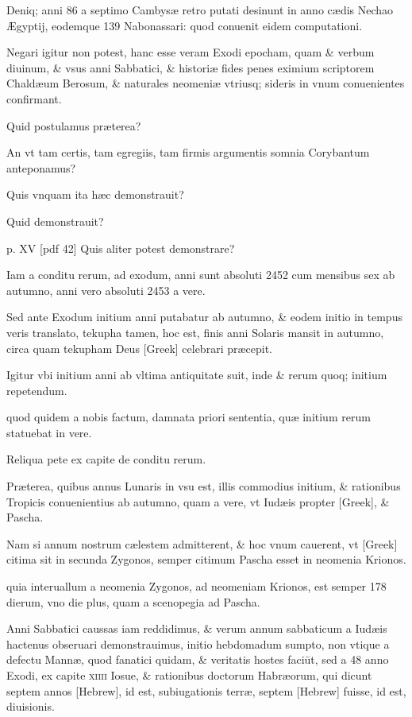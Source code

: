 \begin{parnumbers}
Deniq; anni 86 a septimo Cambysæ retro putati desinunt in anno
cædis Nechao Ægyptij, eodemque 139 Nabonassari: quod conuenit
eidem computationi.

Negari igitur non potest, hanc esse veram
Exodi epocham, quam \& verbum diuinum, \& vsus anni Sabbatici,
\& historiæ fides penes eximium scriptorem Chaldæum
Berosum, \& naturales neomeniæ vtriusq; sideris in vnum conuenientes
confirmant.

Quid postulamus præterea?

An vt tam certis,
tam egregiis, tam firmis argumentis somnia Corybantum anteponamus?

Quis vnquam ita hæc demonstrauit?

Quid demonstrauit?

\clearpage
p. XV [pdf 42]
Quis aliter potest demonstrare?

Iam a conditu rerum, ad exodum,
anni sunt absoluti 2452 cum mensibus sex ab autumno, anni vero
absoluti 2453 a vere.

Sed ante Exodum initium anni putabatur ab
autumno, \& eodem initio in tempus veris translato, tekupha tamen,
hoc est, finis anni Solaris mansit in autumno, circa quam tekupham
Deus \textgreek{[Greek]} celebrari præcepit.

Igitur vbi initium anni
ab vltima antiquitate suit, inde \& rerum quoq; initium repetendum.

quod quidem a nobis factum, damnata priori sententia, quæ
initium rerum statuebat in vere.

Reliqua pete ex capite de conditu
rerum.

Præterea, quibus annus Lunaris in vsu est, illis commodius
initium, \& rationibus Tropicis conuenientius ab autumno, quam
a vere, vt Iudæis propter \textgreek{[Greek]}, \& Pascha.

Nam si annum
nostrum cælestem admitterent, \& hoc vnum cauerent, vt \textgreek{[Greek]}
citima sit in secunda Zygonos, semper citimum Pascha esset in neomenia
Krionos.

quia interuallum a neomenia Zygonos, ad neomeniam
Krionos, est semper 178 dierum, vno die plus, quam a scenopegia
ad Pascha.

Anni Sabbatici caussas iam reddidimus, \& verum
annum sabbaticum a Iudæis hactenus obseruari demonstrauimus,
initio hebdomadum sumpto, non vtique a defectu Mannæ,
quod fanatici quidam, \& veritatis hostes faciūt, sed a 48 anno Exodi,
ex capite \textsc{xiiii} Iosue, \& rationibus doctorum Habræorum, qui
dicunt septem annos \texthebrew{[Hebrew]}, id est, subiugationis terræ,
septem \texthebrew{[Hebrew]}
fuisse, id est, diuisionis.


\end{parnumbers}
